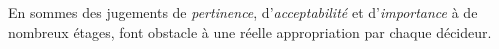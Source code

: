 {%
%  
%  
  }
  
  En sommes des jugements de \emph{pertinence}, d'\emph{acceptabilité} et d'\emph{importance} à de nombreux étages, font obstacle à une réelle appropriation par chaque décideur.
  
  
%   
%  
  
    

